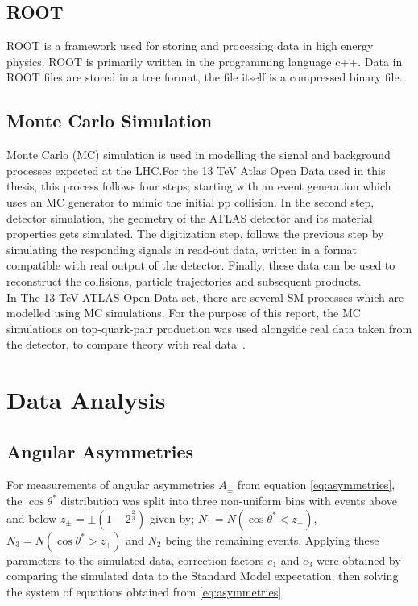\documentclass[12pt,a4paper]{article}
\numberwithin{equation}{section}
\begin{document}
\subsection{ROOT}
ROOT is a framework used for storing and processing data in high energy physics.
ROOT is primarily written in the programming language c++. Data in ROOT files
are stored in a tree format, the file itself is a compressed binary file.
\cite{root}


\subsection{Monte Carlo Simulation}
Monte Carlo (MC) simulation is used in modelling the signal and background
processes expected at the LHC.\@ For the 13 TeV Atlas Open Data used in this
thesis, this process follows four steps; starting with an event generation which
uses an MC generator to mimic the initial pp collision. In the second step,
detector simulation, the geometry of the ATLAS detector and its material
properties gets simulated. The digitization step, follows the previous step by
simulating the responding signals in read-out data, written in a format
compatible with real output of the detector. Finally, these data can be used to
reconstruct the collisions, particle trajectories and subsequent
products.\\

In The 13 TeV ATLAS Open Data set, there are several SM processes which are
modelled using MC simulations. For the purpose of this report, the MC
simulations on top-quark-pair production was used alongside real data taken from
the detector, to compare theory with real data~\cite{mcopenatlas}.




\section{Data Analysis}

\subsection{Angular Asymmetries}
For measurements of angular asymmetries $A_{\pm}$ from equation
\eqref{eq:asymmetries}, the $\cos\theta^{*}$ distribution was split into three
non-uniform bins with events above and below $z_{\pm} = \pm(1-2^{\frac{2}{3}})$
given by; $N_1 = N(\cos \theta^{*}<z_-)$, $N_3 = N(\cos \theta^{*}>z_+)$ and $N_2$ being
the remaining events. Applying these parameters to the simulated data,
correction factors $e_1$ and $e_3$ were obtained by comparing the simulated data
to the Standard Model expectation, then solving the system of equations obtained
from \eqref{eq:asymmetries}.
\end{document}
